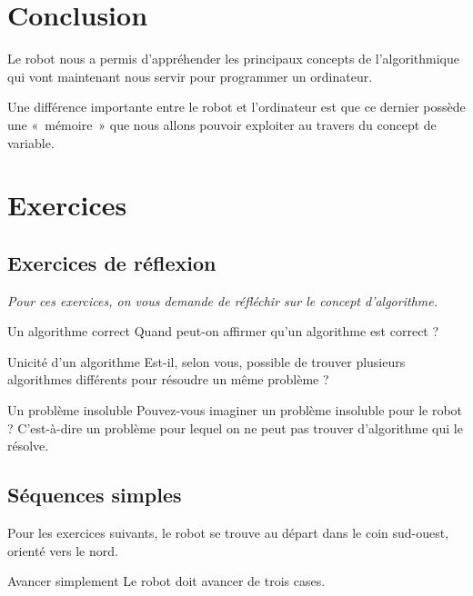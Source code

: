 \section{Conclusion}

	Le robot nous a permis d'appréhender les principaux
	concepts de l'algorithmique qui vont maintenant nous
	servir pour programmer un ordinateur. 
	
	Une différence importante entre le robot et
	l'ordinateur est que ce dernier possède une
	«~mémoire~» que nous allons pouvoir exploiter au travers du concept de
	variable.

\section{Exercices}

	\subsection{Exercices de réflexion}

		\textit{
		Pour ces exercices, on vous demande de réfléchir sur le concept
		d'algorithme.}

\begin{Exercice}{Un algorithme correct}
Quand peut-on affirmer qu'un algorithme est correct ?
\end{Exercice}

\begin{Exercice}{Unicité d'un algorithme}
	Est-il, selon vous, possible de trouver 
	plusieurs algorithmes différents
	pour résoudre un même problème ?
\end{Exercice}

\begin{Exercice}{Un problème insoluble}
	Pouvez-vous imaginer un problème insoluble pour le robot ?
	C'est-à-dire un problème pour lequel on ne peut pas
	trouver d'algorithme qui le résolve.
\end{Exercice}

	\subsection{Séquences simples}
	
		Pour les exercices suivants, le robot se trouve 
		au départ dans le coin sud-ouest, 
		orienté vers le nord.

\begin{Exercice}{Avancer simplement}
	Le robot doit avancer de trois cases.
\end{Exercice}

